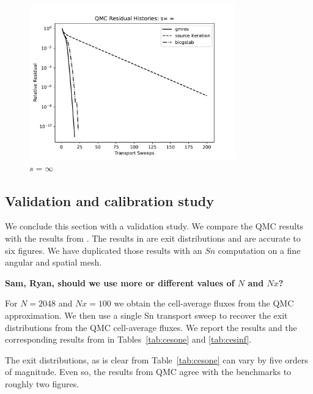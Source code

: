 \begin{figure}[h]
\centerline{
\includegraphics[width=3.5in]{FIGURES/seqinf.pdf}
}
\caption{\label{fig:hard} $s=\infty$}
\end{figure}

\clearpage

\subsection{Validation and calibration study}
\label{validation-and-calibration-study}

We conclude this section with a validation study. We compare the
QMC results with the results from \cite{cesinh}. The results
in \cite{cesinh} are exit distributions and are accurate to 
six figures. We have duplicated those results with an $Sn$ computation
on a fine angular and spatial mesh.

{\bf Sam, Ryan, should we use more or different values of $N$ and $Nx$?}

For $N = 2048$ and $Nx=100$ we obtain the cell-average fluxes from
the QMC approximation. We then use a single Sn transport sweep to recover
the exit distributions from the QMC cell-average fluxes. We report
the results and the corresponding results from \cite{cesinh} in 
Tables~\ref{tab:cesone} and \ref{tab:cesinf}.

The exit distributions, as is clear from Table~\ref{tab:cesone}
can vary by five orders of magnitude. Even so, the results from QMC
agree with the benchmarks to roughly two figures.

